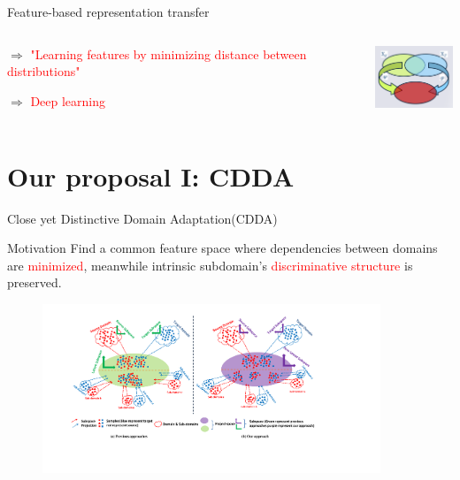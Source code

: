 \documentclass{beamer}
\begin{document}
\begin{frame}{Feature-based representation transfer}

\begin{minipage}[0.1\textheight]{\textwidth}
\begin{columns}[totalwidth=\textwidth]
\begin{column}{0.8\textwidth}
$\Rightarrow$ \textcolor{red}{ "Learning features by minimizing distance between distributions" }

$\Rightarrow$ \textcolor{red}{ Deep learning }
\end{column}
\begin{column}{0.2\textwidth}
\includegraphics[width=2.5cm]{figs/f7.png}
\end{column}
\end{columns}
\end{minipage}
\end{frame}




\section{Our proposal I: CDDA}
\begin{frame}{Close yet Distinctive Domain Adaptation(CDDA)}
\small
\begin{block}{Motivation}
Find a common feature space where dependencies between domains are \textcolor{red}{minimized}, meanwhile intrinsic subdomain's \textcolor{red}{discriminative structure} is preserved. 
\end{block}
\begin{figure}
\includegraphics[width=0.9\textwidth]{figs/iccv.pdf}
\end{figure}
\end{frame}
\end{document}
